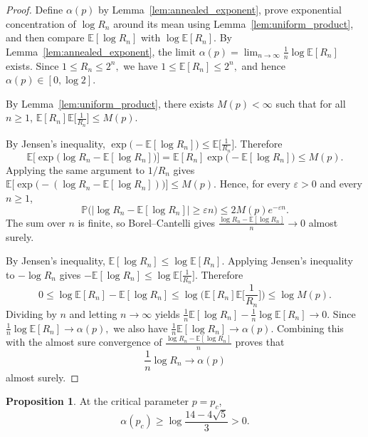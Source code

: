 \documentclass{article}
\theoremstyle{plain}
\theoremstyle{definition}
\newtheorem{proposition}[theorem]{Proposition}
\begin{document}
\begin{proof}
 
Define $\alpha(p)$ by Lemma~\ref{lem:annealed_exponent}, prove exponential concentration of $\log R_n$ around its mean using Lemma~\ref{lem:uniform_product}, and then compare $\mathbb E[\log R_n]$ with $\log \mathbb E[R_n]$.
By Lemma~\ref{lem:annealed_exponent}, the limit
$
\alpha(p)=\lim_{n\to\infty}\frac{1}{n}\log \mathbb E[R_n]
$
exists.
Since
$
1\le R_n\le 2^n,
$
we have
$
1\le \mathbb E[R_n]\le 2^n,
$
and hence
$
\alpha(p)\in[0,\log 2].
$

By Lemma~\ref{lem:uniform_product}, there exists $M(p)<\infty$ such that for all $n\ge 1$,
$
\mathbb E[R_n]\mathbb E\Big[\frac{1}{R_n}\Big]\le M(p).
$

By Jensen's inequality,
$
\exp\big(-\mathbb E[\log R_n]\big)\le \mathbb E\Big[\frac{1}{R_n}\Big].
$
Therefore
\[
\mathbb E\Big[\exp\big(\log R_n-\mathbb E[\log R_n]\big)\Big]
=
\mathbb E[R_n]\exp\big(-\mathbb E[\log R_n]\big)
\le
M(p).
\]
Applying the same argument to $1/R_n$ gives
$
\mathbb E\Big[\exp\big(-(\log R_n-\mathbb E[\log R_n])\big)\Big]\le M(p).
$
Hence, for every $\varepsilon>0$ and every $n\ge 1$,
\[
\mathbb P\Big(\big|\log R_n-\mathbb E[\log R_n]\big|\ge \varepsilon n\Big)
\le
2M(p)e^{-\varepsilon n}.
\]
The sum over $n$ is finite, so Borel--Cantelli gives
$
\frac{\log R_n-\mathbb E[\log R_n]}{n}\to 0
$
almost surely.

By Jensen's inequality,
$
\mathbb E[\log R_n]\le \log \mathbb E[R_n].
$
Applying Jensen's inequality to $-\log R_n$ gives
$
-\mathbb E[\log R_n]\le \log \mathbb E\Big[\frac{1}{R_n}\Big].
$
Therefore
\[
0\le \log \mathbb E[R_n]-\mathbb E[\log R_n]
\le
\log\Big(\mathbb E[R_n]\mathbb E\Big[\frac{1}{R_n}\Big]\Big)
\le
\log M(p).
\]
Dividing by $n$ and letting $n\to\infty$ yields
$
\frac{1}{n}\mathbb E[\log R_n]-\frac{1}{n}\log \mathbb E[R_n]\to 0.
$
Since
$
\frac{1}{n}\log \mathbb E[R_n]\to \alpha(p),
$
we also have
$
\frac{1}{n}\mathbb E[\log R_n]\to \alpha(p).
$
Combining this with the almost sure convergence of
$
\frac{\log R_n-\mathbb E[\log R_n]}{n}
$
proves that
\[
\frac{1}{n}\log R_n\to \alpha(p)
\]
almost surely.
\end{proof}

\begin{proposition}\label{prop:alpha_pc_positive}
At the critical parameter \(p=p_c\),
\[
\alpha(p_c)\ge \log\frac{14-4\sqrt5}{3}>0.
\]
\end{proposition}
\end{document}
